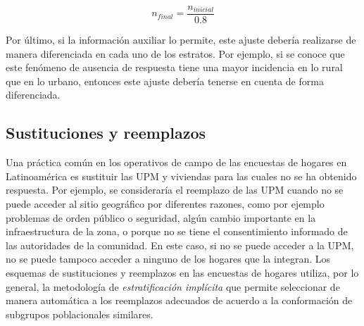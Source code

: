 \documentclass[
  12pt,
  spanish,
]{book}
\begin{document}
\[n_{final} = \frac{n_{inicial}}{0.8}\]

Por último, si la información auxiliar lo permite, este ajuste debería realizarse de manera diferenciada en cada uno de los estratos. Por ejemplo, si se conoce que este fenómeno de ausencia de respuesta tiene una mayor incidencia en lo rural que en lo urbano, entonces este ajuste debería tenerse en cuenta de forma diferenciada.

\hypertarget{sustituciones-y-reemplazos}{%
\subsection{Sustituciones y reemplazos}\label{sustituciones-y-reemplazos}}

Una práctica común en los operativos de campo de las encuestas de hogares en Latinoamérica es sustituir las UPM y viviendas para las cuales no se ha obtenido respuesta. Por ejemplo, se consideraría el reemplazo de las UPM cuando no se puede acceder al sitio geográfico por diferentes razones, como por ejemplo problemas de orden público o seguridad, algún cambio importante en la infraestructura de la zona, o porque no se tiene el consentimiento informado de las autoridades de la comunidad. En este caso, si no se puede acceder a la UPM, no se puede tampoco acceder a ninguno de los hogares que la integran. Los esquemas de sustituciones y reemplazos en las encuestas de hogares utiliza, por lo general, la metodología de \emph{estratificación implícita} que permite seleccionar de manera automática a los reemplazos adecuados de acuerdo a la conformación de subgrupos poblacionales similares.
\end{document}
